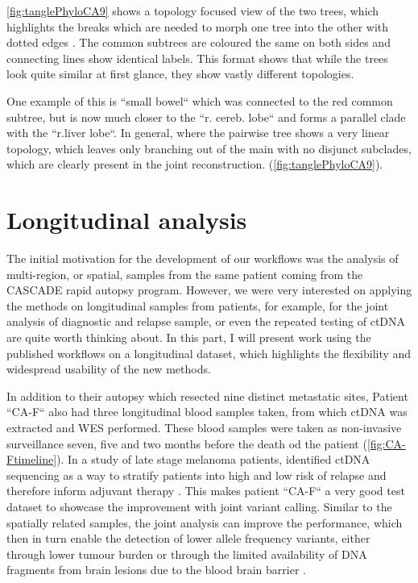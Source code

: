 \autoref{fig:tanglePhyloCA9} shows a topology focused view of the two trees, which highlights the breaks which are needed to morph one tree into the other with dotted edges \cite{Vienne2018}. The common subtrees are coloured the same on both sides and connecting lines show identical labels. This format shows that while the trees look quite similar at first glance, they show vastly different topologies.


One example of this is ``small bowel`` which was connected to the red common subtree, but is now much closer to the ``r. cereb. lobe`` and forms a parallel clade with the ``r.liver lobe``. In general, where the pairwise tree shows a very linear topology, which leaves only branching out of the main with no disjunct subclades, which are clearly present in the joint reconstruction.  (\autoref{fig:tanglePhyloCA9}).


\section[Longitudinal analysis]{Longitudinal analysis}
\label{variantcalling-sec:longitudinal}

The initial motivation for the development of our workflows was the analysis of multi-region, or spatial, samples from the same patient coming from the CASCADE rapid autopsy program. However, we were very interested on applying the methods on longitudinal samples from patients, for example, for the joint analysis of diagnostic and relapse sample, or even the repeated testing of ctDNA are quite worth thinking about. In this part, I will present work using the published workflows on a longitudinal dataset, which highlights the flexibility and widespread usability of the new methods.

In addition to their autopsy which resected nine distinct metastatic sites, Patient ``CA-F`` also had three longitudinal blood samples taken, from which ctDNA was extracted and WES performed. These blood samples were taken as non-invasive surveillance seven, five and two months before the death od the patient (\autoref{fig:CA-Ftimeline}). In a study of late stage melanoma patients,  identified ctDNA sequencing as a way to stratify patients into high and low risk of relapse and therefore inform adjuvant therapy \cite{Tan2019}. This makes patient ``CA-F`` a very good test dataset to showcase the improvement with joint variant calling. Similar to the spatially related samples, the joint analysis can improve the performance, which then in turn enable the detection of lower allele frequency variants, either through lower tumour burden or through the limited availability of DNA fragments from brain lesions due to the blood brain barrier \cite{2014}.

